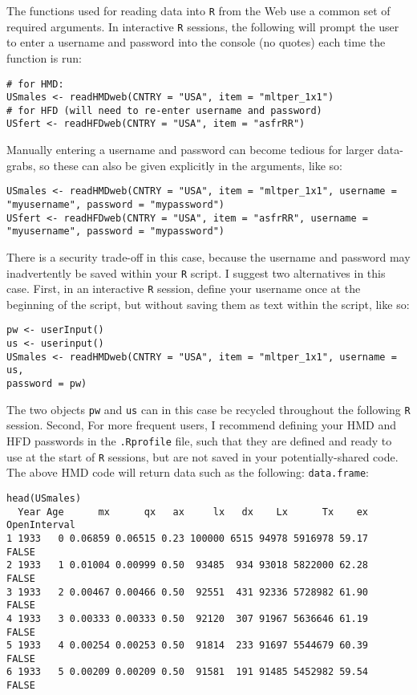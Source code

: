 \documentclass{article}
\begin{document}
The functions used for reading data into \texttt{R} from the Web use a
common set of required arguments. In interactive \texttt{R} sessions, the
following will prompt the user to enter a username and password into the
console (no quotes) each time the function is run:
\begin{small}
\begin{verbatim}
# for HMD:
USmales <- readHMDweb(CNTRY = "USA", item = "mltper_1x1")
# for HFD (will need to re-enter username and password)
USfert <- readHFDweb(CNTRY = "USA", item = "asfrRR")
\end{verbatim}
\end{small}
Manually entering a username and password can become tedious for larger
data-grabs, so these can also be given explicitly in the arguments, like so:
\begin{small}
\begin{verbatim}
USmales <- readHMDweb(CNTRY = "USA", item = "mltper_1x1", username =
"myusername", password = "mypassword")
USfert <- readHFDweb(CNTRY = "USA", item = "asfrRR", username =
"myusername", password = "mypassword")
\end{verbatim}
\end{small}
There is a security trade-off in this case, because the username and password
may inadvertently be saved within your \texttt{R} script. I suggest two
alternatives in this case. First, in an interactive \texttt{R} session, define your username once at
the beginning of the script, but without saving them as text within the script,
like so:
\begin{small}
\begin{verbatim}
pw <- userInput()
us <- userinput()
USmales <- readHMDweb(CNTRY = "USA", item = "mltper_1x1", username = us,
password = pw)
\end{verbatim}
\end{small}
The two objects \texttt{pw} and \texttt{us} can in this case be recycled
throughout the following \texttt{R} session. Second, For more frequent users, I
recommend defining your HMD and HFD passwords in the \texttt{.Rprofile} file,
such that they are defined and ready to use at the start of \texttt{R}
sessions, but are not saved in your potentially-shared code. The above HMD
code will return data such as the following:
\texttt{data.frame}:
\begin{small}
\begin{verbatim}
head(USmales)
  Year Age      mx      qx   ax     lx   dx    Lx      Tx    ex OpenInterval
1 1933   0 0.06859 0.06515 0.23 100000 6515 94978 5916978 59.17        FALSE
2 1933   1 0.01004 0.00999 0.50  93485  934 93018 5822000 62.28        FALSE
3 1933   2 0.00467 0.00466 0.50  92551  431 92336 5728982 61.90        FALSE
4 1933   3 0.00333 0.00333 0.50  92120  307 91967 5636646 61.19        FALSE
5 1933   4 0.00254 0.00253 0.50  91814  233 91697 5544679 60.39        FALSE
6 1933   5 0.00209 0.00209 0.50  91581  191 91485 5452982 59.54        FALSE
\end{verbatim}
\end{small}
\end{document}
